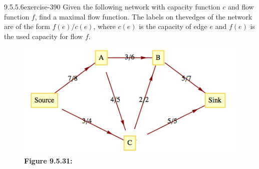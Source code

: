 \documentclass[twoside,10pt,]{book}
\numberwithin{equation}{section}
\begin{document}
\begin{divisionsolution}{9.5.5.6}{}{exercise-390}%
\hypertarget{p-3406}{}%
Given the following network with capacity function \(c\) and flow function \(f\), find a maximal flow function. The labels on thevedges of the network are of the form \(f(e)/c(e)\), where \(c(e)\) is the capacity of edge \(e\) and \(f(e)\) is the used capacity for flow \(f\).%
\begin{figure}
\centering
\includegraphics[width=0.7\linewidth]{images/fig-exercise-9-5-6.png}
\caption*{\textbf{Figure 9.5.31:} }
\end{figure}
\end{divisionsolution}%
\end{document}
